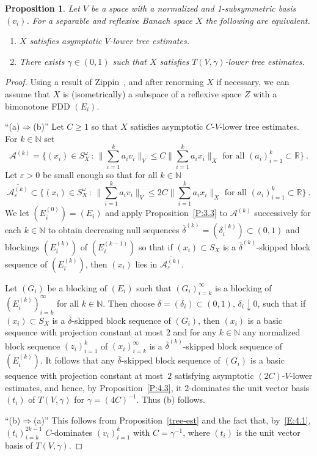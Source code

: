 \documentclass[11pt,leqno]{amsart}
\newtheorem{prop}[thm]{Proposition}
\theoremstyle{definition}
\newcommand{\N}{\mathbb{N}}
\newcommand{\R}{\mathbb{R}}
\newcommand{\cA}{\mathcal{A}}
\newcommand{\vp}{\varepsilon}
\newcommand{\deltab}{\overline\delta}
\begin{document}
\begin{prop}\label{P:4.4}
 Let $V$ be a space with a normalized and 1-subsymmetric basis
 $(v_i)$. For a separable and reflexive Banach space $X$ the following
 are equivalent.
 \begin{enumerate}
 \item[a)]
   $X$ satisfies asymptotic $V$-lower tree estimates.
 \item[b)]
   There exists $\gamma\in(0,1)$ such that $X$ satisfies
   $T(V,\gamma)$-lower tree estimates.
 \end{enumerate}
\end{prop}
\begin{proof}
  Using a result of Zippin~\cite{Z}, and after renorming $X$ if
  necessary, we can assume that $X$ is (isometrically) a subspace of a
  reflexive space  $Z$ with a bimonotone FDD $(E_i)$.
  
  \noindent
  ``(a)$\Rightarrow$(b)'' Let $C\ge 1$ so that $X$ satisfies
  asymptotic $C$-$V$-lower tree estimates. For $k\in\N$ set
  \[
  \cA^{(k)}=\Big\{(x_i)\in S_X^\omega \,:\,\Big\|\sum_{i=1}^k a_i
  v_i\Big\|_V\le C \Big\|\sum_{i=1}^k a_i x_i\Big\|_X \text{ for all
  }(a_i)_{i=1}^k\subset \R\Big\}\ .
  \]
  Let $\vp>0$ be small enough so that for all $k\in\N$
  \[
  \overline{\cA^{(k)}_\vp}\subset
  \Big\{(x_i)\in S_X^\omega \,:\,\Big\|\sum_{i=1}^k a_i v_i\Big\|_V\le
  2C \Big\|\sum_{i=1}^k a_i x_i\Big\|_X \text{ for all
  }(a_i)_{i=1}^k\subset \R\Big\}\ .
  \]
  We let $(E^{(0)}_i)=(E_i)$ and apply Proposition~\ref{P:3.3} to
  $\cA^{(k)}$ successively for each $k\in\N$ to obtain decreasing
  null sequences $\deltab^{(k)}=(\delta^{(k)}_i)\subset(0,1)$ and
  blockings $(E^{(k)}_i)$ of $(E^{(k-1)}_i)$ so that if $(x_i)\subset
  S_X$ is a $\deltab^{(k)}$-skipped block sequence of $(E^{(k)}_i)$,
  then $(x_i)$ lies in $\overline{\cA^{(k)}_\vp}$.

  Let $(G_i)$ be a blocking of $(E_i)$ such that $(G_i)_{i=k}^\infty$
  is a blocking of $(E^{(k)}_i)_{i=k}^\infty$ for all $k\in\N$. Then
  choose $\deltab=(\delta_i)\subset(0,1)$, $\delta_i\downarrow 0$,
  such that if $(x_i)\subset S_X$ is a $\deltab$-skipped block
  sequence of $(G_i)$, then $(x_i)$ is a basic sequence with
  projection constant at most $2$ and for any $k\in\N$ any normalized
  block sequence $(z_i)_{i=1}^k$ of $(x_i)_{i=k}^\infty$ is a
  $\deltab^{(k)}$-skipped block sequence of $(E^{(k)}_i)$. It follows
  that any $\deltab$-skipped block sequence of $(G_i)$ is a basic
  sequence with projection constant at most~$2$ satisfying
  asymptotic $(2C)$-$V$-lower estimates, and hence, by
  Proposition~\ref{P:4.3}, it $2$-dominates the unit vector basis
  $(t_i)$ of $T(V,\gamma)$ for $\gamma=(4C)^{-1}$. Thus (b) follows.

  \noindent
  ``(b)$\Rightarrow$(a)'' This follows from Proposition~\ref{tree-est}
  and the fact that, by~\eqref{E:4.1}, $(t_i)_{i=k}^{2k-1}$
  $C$-dominates $(v_i)_{i=1}^k$ with $C=\gamma^{-1}$, where $(t_i)$ is
  the unit vector basis of $T(V,\gamma)$.
\end{proof}
\end{document}
